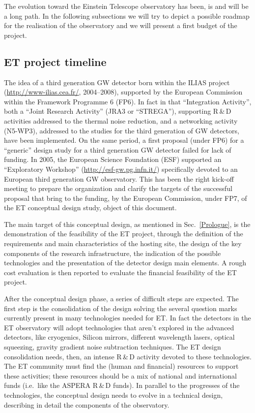 %
%
%
%
%
The evolution toward the Einstein Telescope observatory has been, is and will be a long path.  In the following subsections we will try to depict a possible roadmap for the realisation of the observatory and we will present a first budget of the project. 
%
\subsection[ET Timeline]{ET project timeline}
%
\label{TimelineSubSection}
The idea of a third generation GW detector born within the ILIAS project (\url{http://www-ilias.cea.fr/}, 2004--2008), supported by the European Commission within the Framework Programme 6 (FP6). In fact in that ``Integration Activity'', both a ``Joint Research Activity'' (JRA3 or ``STREGA''), supporting R\,\&\,D  activities addressed to the thermal noise reduction, and a networking activity (N5-WP3), addressed to the studies for the third generation of GW detectors, have been implemented.  On the same period, a first proposal (under FP6) for a ``generic'' design study for a third generation GW detector failed for lack of funding.  
In 2005, the European Science Foundation (ESF) supported an  ``Exploratory Workshop'' (\url{http://esf-gw.pg.infn.it/}) specifically devoted to an European third generation GW observatory. This has been the right kick-off meeting to prepare the organization and clarify the targets of the successful proposal that bring to  the funding, by the European Commission, under FP7, of the ET conceptual design study, object of this document. 
\par
The main target of this conceptual design, as mentioned in Sec.~\ref{Prologue}, is the demonstration of the feasibility of the ET project, through the definition of the requirements and main characteristics of the hosting site, the design of the key components of the research infrastructure, the indication of the possible technologies and the presentation of the detector design main elements. A rough cost evaluation is then reported to evaluate the financial feasibility of the ET project.
\par 
After the conceptual design phase, a series of difficult steps are expected. 
The first step is the consolidation of the design solving the several question marks currently present in many technologies needed for ET. In fact the detectors in the ET observatory will adopt technologies that aren't explored in the advanced detectors, like cryogenics, Silicon mirrors, different wavelength lasers, optical squeezing, gravity gradient noise subtraction techniques. The ET design consolidation needs, then, an intense R\,\&\,D activity devoted to these technologies. The ET community must find the (human and financial) resources  to support these activities; these resources  should be a mix of national and international funds (i.e.\ like the ASPERA R\,\&\,D funds).   In parallel to the progresses of the technologies, the conceptual design needs to evolve in a technical design, describing in detail the components of the observatory.
